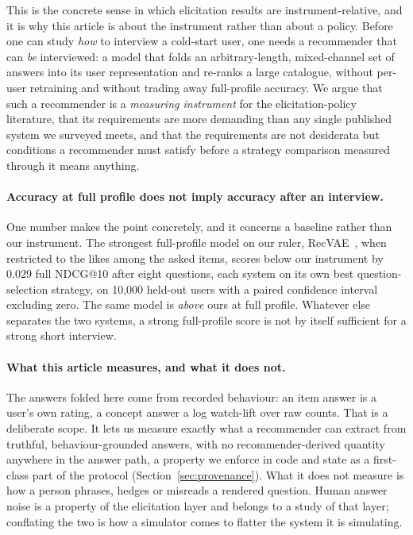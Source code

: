 \documentclass[manuscript,screen]{acmart}
\begin{document}
This is the concrete sense in which elicitation results are instrument-relative, and it is why this article is about the instrument rather than about a policy. Before one can study \emph{how} to interview a cold-start user, one needs a recommender that can \emph{be} interviewed: a model that folds an arbitrary-length, mixed-channel set of answers into its user representation and re-ranks a large catalogue, without per-user retraining and without trading away full-profile accuracy. We argue that such a recommender is a \emph{measuring instrument} for the elicitation-policy literature, that its requirements are more demanding than any single published system we surveyed meets, and that the requirements are not desiderata but conditions a recommender must satisfy before a strategy comparison measured through it means anything.

\paragraph{Accuracy at full profile does not imply accuracy after an interview.} One number makes the point concretely, and it concerns a baseline rather than our instrument. The strongest full-profile model on our ruler, RecVAE~\citep{ren2020recvae}, when restricted to the likes among the asked items, scores below our instrument by $0.029$ full NDCG@10 after eight questions, each system on its own best question-selection strategy, on 10,000 held-out users with a paired confidence interval excluding zero. The same model is \emph{above} ours at full profile. Whatever else separates the two systems, a strong full-profile score is not by itself sufficient for a strong short interview.

\paragraph{What this article measures, and what it does not.} The answers folded here come from recorded behaviour: an item answer is a user's own rating, a concept answer a log watch-lift over raw counts. That is a deliberate scope. It lets us measure exactly what a recommender can extract from truthful, behaviour-grounded answers, with no recommender-derived quantity anywhere in the answer path, a property we enforce in code and state as a first-class part of the protocol (Section~\ref{sec:provenance}). What it does not measure is how a person phrases, hedges or misreads a rendered question. Human answer noise is a property of the elicitation layer and belongs to a study of that layer; conflating the two is how a simulator comes to flatter the system it is simulating.
\end{document}

